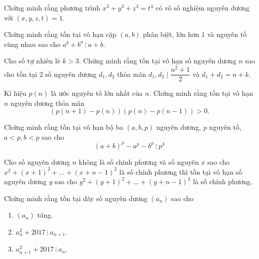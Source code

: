 \begin{bt}%
	Chứng minh rằng phương trình $x^3+y^3+z^3=t^4$ có vô số nghiệm nguyên dương với $\left( x, y, z, t \right)=1$. 
\end{bt}

\begin{bt}[USA MO 2017]%
	Chứng minh rằng tồn tại vô hạn cặp $(a,b)$ phân biệt, lớn hơn $1$ và nguyên tố cùng nhau sao cho $a^b +b^a \ \vdots \ a+b$.
\end{bt}

\begin{bt}%
	Cho số tự nhiên lẻ $k>3$. Chứng minh rằng tồn tại vô hạn số nguyên dương $n$ sao cho tồn tại $2$ số nguyên dương $d_1,d_2$ thỏa mãn $d_1, d_2 \mid \dfrac{n^2+1}{2}$ và $d_1+ d_2 =n+k$.
\end{bt}

\begin{bt}%
	Kí hiệu $p(n)$ là ước nguyên tố lớn nhất của $n$. Chứng minh rằng tồn tại vô hạn $n$ nguyên dương thỏa mãn $$\left( p(n+1) -p(n)\right) \left(p(n) - p(n-1) \right) >0.$$
\end{bt}

\begin{bt}%
	Chứng minh rằng tồn tại vô hạn bộ ba $(a,b,p)$ nguyên dương, $p$ nguyên tố, $a<p, b<p$ sao cho $$(a+b)^p -a^p -b^p \ \vdots \ p^3 $$
\end{bt}

\begin{bt}%
	Cho số nguyên dương $n$ không là số chính phương và số nguyên $x$ sao cho $x^2+ (x+1)^2 + \ldots + (x+n-1)^2$ là số chính phương thì tồn tại vô hạn số nguyên dương $y$ sao cho $y^2+ (y+1)^2 + \ldots + (y+n-1)^2$ là số chính phương.
\end{bt}

\begin{bt}%
	Chứng minh rằng tồn tại dãy số nguyên dương $(a_n)$ sao cho 
	\begin{enumerate}
		\item $(a_n)$ tăng.
		\item $a_n^2 +2017 \ \vdots \ a_{n+1}$.
		\item $a_{n+1}^2 + 2017 \ \vdots \ a_n$.
	\end{enumerate}
\end{bt}

